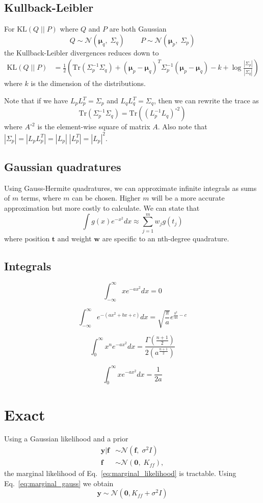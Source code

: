 \documentclass[5p,11pt]{article}
\begin{document}
\subsection{Kullback-Leibler}
For $\mathrm{KL}(Q\;||\;P)$ where $Q$ and $P$ are both Gaussian
$$ Q \sim \mathcal{N}(\bm{\mu}_q,\; \Sigma_q) \;\;\;\;\;\;\;\; P \sim \mathcal{N}(\bm{\mu}_p,\; \Sigma_p) $$
the Kullback-Leibler divergences reduces down to
\begin{equation}
    \begin{aligned}
    \mathrm{KL}(Q\;||\;P) &= \frac{1}{2}\left( \mathrm{Tr}(\Sigma_p^{-1}\Sigma_q) + (\bm{\mu}_p - \bm{\mu}_q)^T\Sigma_p^{-1}(\bm{\mu}_p - \bm{\mu}_q) - k + \log \frac{|\Sigma_p|}{|\Sigma_q|} \right)
    \end{aligned}
\end{equation}
where $k$ is the dimension of the distributions.

Note that if we have $L_pL_p^T = \Sigma_p$ and $L_qL_q^T = \Sigma_q$, then we can rewrite the trace as
$$ \mathrm{Tr}(\Sigma_p^{-1}\Sigma_q) = \mathrm{Tr}\left((L_p^{-1}L_q)^{\circ2}\right) $$
where $A^{\circ2}$ is the element-wise square of matrix $A$. Also note that $|\Sigma_p| = |L_pL_p^T| = |L_p|\;|L_p^T| = |L_p|^2$.

\subsection{Gaussian quadratures}
Using Gauss-Hermite quadratures, we can approximate infinite integrals as sums of $m$ terms, where $m$ can be chosen. Higher $m$ will be a more accurate approximation but more costly to calculate. We can state that
$$ \int g(x) e^{-x^2} dx \approx \sum_{j=1}^m w_j g(t_j) $$
where position $\bm{t}$ and weight $\bm{w}$ are specific to an nth-degree quadrature.

\subsection{Integrals}
$$ \int_{-\infty}^\infty x e^{-ax^2} dx = 0 $$

$$ \int_{-\infty}^\infty e^{-(ax^2 + bx +c)} dx = \sqrt{\frac{\pi}{a}} e^{\frac{b^2}{4a} - c} $$

$$ \int_0^\infty x^n e^{-ax^2} dx = \frac{\Gamma\left(\frac{n+1}{2}\right)}{2\left(a^{\frac{n+1}{2}}\right)} $$

$$ \int_0^\infty x e^{-ax^2} dx = \frac{1}{2a} $$


\newpage
\section{Exact}
Using a Gaussian likelihood and a prior
\begin{equation}
    \begin{aligned}
    \bm{y}|\bm{f} &\sim \mathcal{N}(\bm{f},\;\sigma^2I) \\
    \bm{f} &\sim \mathcal{N}(\bm{0},\;K_{ff}),
    \end{aligned}
\end{equation}
the marginal likelihood of Eq.~\ref{eq:marginal_likelihood} is tractable. Using Eq.~\ref{eq:marginal_gauss} we obtain
$$ \bm{y} \sim \mathcal{N}(\bm{0},K_{ff}+\sigma^2I) $$
\end{document}
